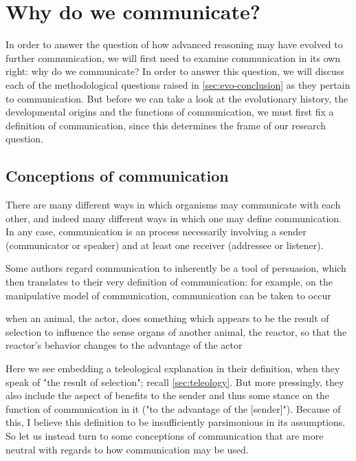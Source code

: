 \chapter{Why do we communicate?}
\label{ch:communication}

In order to answer the question of how advanced reasoning may have evolved to further communication, we will first need to examine communication in its own right: why do we communicate?
In order to answer this question, we will discuss each of the methodological questions raised in \cref{sec:evo-conclusion} as they pertain to communication. But before we can take a look at the evolutionary history, the developmental origins and the functions of communication, we must first fix a definition of communication, since this determines the frame of our research question.

\section{Conceptions of communication}
\label{sec:comm:definition}

There are many different ways in which organisms may communicate with each other, and indeed many different ways in which one may define communication. In any case, communication is an process necessarily involving a sender (communicator or speaker) and at least one receiver (addressee or listener).

Some authors regard communication to inherently be a tool of persuasion, which then translates to their very definition of communication: for example, on the manipulative model of communication, communication can be taken to occur
\begin{quoting}
    when an animal, the actor, does something which appears to be the result of selection to influence the sense organs of another animal, the reactor, so that the reactor's behavior changes to the advantage of the actor
    \hfill \citep[p.~283]{DawkinsKrebs78}
\end{quoting}
Here we see \citeauthor{DawkinsKrebs78} embedding a teleological explanation in their definition, when they speak of "the result of selection"; recall \cref{sec:teleology}.
But more pressingly, they also include the aspect of benefits to the sender and thus some stance on the function of communication in it ("to the advantage of the [sender]").
Because of this, I believe this definition to be insufficiently parsimonious in its assumptions. So let us instead turn to some conceptions of communication that are more neutral with regards to how communication may be used.

